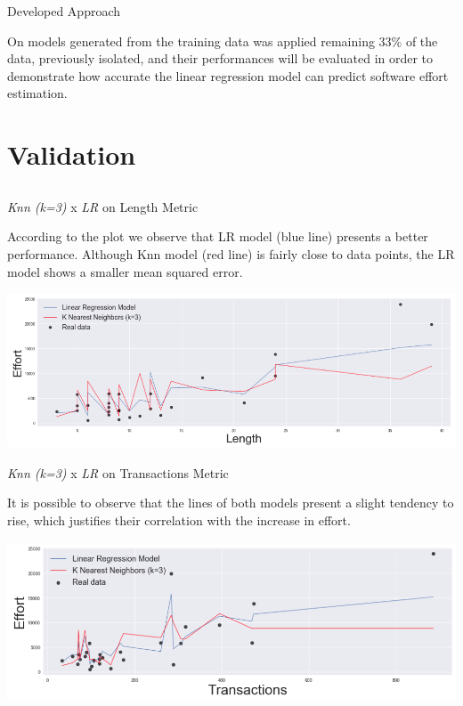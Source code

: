 \documentclass{beamer}
\begin{document}
\begin{frame}{Developed Approach}
	\begin{block}{}
      On models generated from the training data was applied remaining 33\% of the data, previously isolated, and their performances will be evaluated in order to demonstrate how accurate the linear regression model can predict software effort estimation. 
	\end{block}
	
\end{frame}


\section{Validation}
\subsection{}
\begin{frame}{\textit{Knn (k=3)} x \textit{LR} on Length Metric}
	\begin{block}{}
    According to the plot we observe that LR model (blue line) presents a better performance. Although Knn model (red line) is fairly close to data points, the LR model shows a smaller mean squared error. 
		\begin{center}
				\includegraphics[height=4.6cm,width=4.6 in]{img/lenght_plot.png}
		\end{center}
	\end{block}
\end{frame}

\begin{frame}{\textit{Knn (k=3)} x \textit{LR} on Transactions Metric}
	\begin{block}{}
    It is possible to observe that the lines of both models present a slight tendency to rise, which justifies their correlation with the increase in effort.
		\begin{center}
				\includegraphics[height=4.7cm,width=4.6 in]{img/transactions_plot.png}
		\end{center}
	\end{block}
\end{frame}
\end{document}
